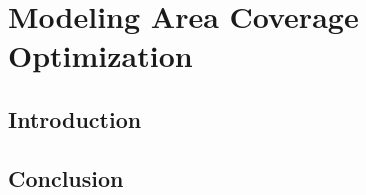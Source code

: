 \chapter{Modeling Area Coverage Optimization}
\label{chap:areaCoverageModeling}

\section{Introduction}
\label{sec:introAreaCoverageModeling}

\section{Conclusion}
\label{sec:conclusionAreaCoverageModeling}